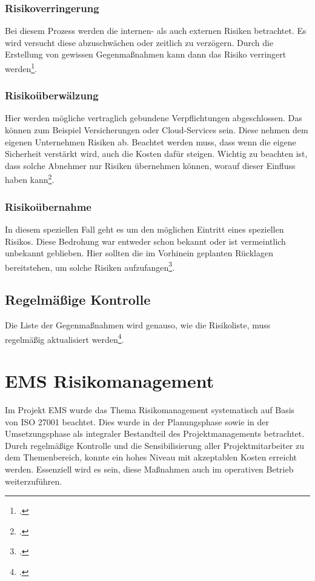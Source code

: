 \subsubsection{Risikoverringerung}
Bei diesem Prozess werden die internen- als auch externen Risiken betrachtet. Es wird versucht diese abzuschwächen oder zeitlich zu verzögern. Durch die Erstellung von gewissen Gegenmaßnahmen kann dann das Risiko verringert werden\footcite{risikomanagement-diplomarbeit}.

\subsubsection{Risikoüberwälzung}
Hier werden mögliche vertraglich gebundene Verpflichtungen abgeschlossen. Das können zum Beispiel Versicherungen oder Cloud-Services sein. Diese nehmen dem eigenen Unternehmen Risiken ab. Beachtet werden muss, dass wenn die eigene Sicherheit verstärkt wird, auch die Kosten dafür steigen. Wichtig zu beachten ist, dass solche Abnehmer nur Risiken übernehmen können, worauf dieser Einfluss haben kann\footcite{risikomanagement-diplomarbeit}.

\subsubsection{Risikoübernahme}
In diesem speziellen Fall geht es um den möglichen Eintritt eines speziellen Risikos. Diese Bedrohung war entweder schon bekannt oder ist vermeintlich unbekannt geblieben. Hier sollten die im Vorhinein geplanten Rücklagen bereitstehen, um solche Risiken aufzufangen\footcite{risikomanagement-diplomarbeit}.

\subsection{Regelmäßige Kontrolle}
Die Liste der Gegenmaßnahmen wird genauso, wie die Risikoliste, muss regelmäßig aktualisiert werden\footcite{bva-risikomanagement}.  

\newpage
\section{EMS Risikomanagement}
Im Projekt EMS wurde das Thema Risikomanagement systematisch auf Basis von ISO 27001 beachtet. Dies wurde in der Planungsphase sowie in der Umsetzungsphase als integraler Bestandteil des Projektmanagements betrachtet. Durch regelmäßige Kontrolle und die Sensibilisierung aller Projektmitarbeiter zu dem Themenbereich, konnte ein hohes Niveau mit akzeptablen Kosten erreicht werden. Essenziell wird es sein, diese Maßnahmen auch im operativen Betrieb weiterzuführen.

